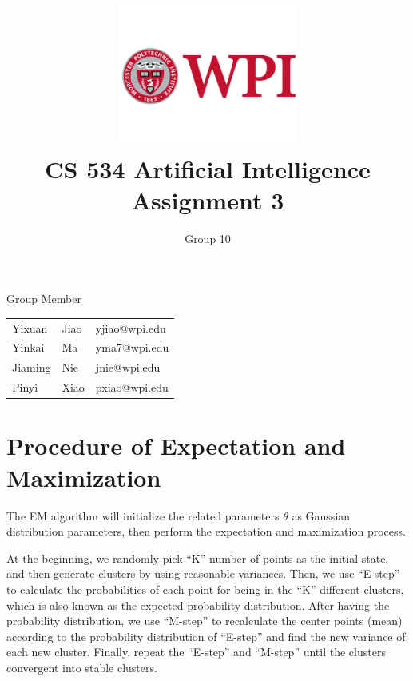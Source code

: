 \documentclass[11pt, a4paper]{article}
\title{\includegraphics[width=0.45\textwidth]{wpi2}
        \\CS 534 Artificial Intelligence \\ Assignment 3 }          %
\author{Group 10 }                    %
\begin{document}
\begin{titlepage}
	
\maketitle
{} %

\begin{center}
Group Member
\end{center}

\begin{table}[htbp] 
\begin{center}
\begin{tabular}{l l l} 
	 
	 Yixuan & Jiao  &   yjiao@wpi.edu \\
     Yinkai & Ma  &   yma7@wpi.edu \\
     Jiaming & Nie  &  jnie@wpi.edu \\
     Pinyi & Xiao  &  pxiao@wpi.edu \\
\end{tabular}
\end{center}
\end{table}



\thispagestyle{empty}  %

\end{titlepage}

\section{Procedure of Expectation and Maximization}

The EM algorithm will initialize the related parameters $\theta$ as Gaussian distribution parameters, then perform the expectation and maximization process.


At the beginning, we randomly pick “K” number of points as the initial state, and then generate clusters by using reasonable variances. Then, we use “E-step” to calculate the probabilities of each point for being in the “K” different clusters, which is also known as the expected probability distribution. After having the probability distribution, we use “M-step” to recalculate the center points (mean) according to the probability distribution of “E-step” and find the new variance of each new cluster. Finally, repeat the “E-step” and “M-step” until the clusters convergent into stable clusters.
\end{document}
